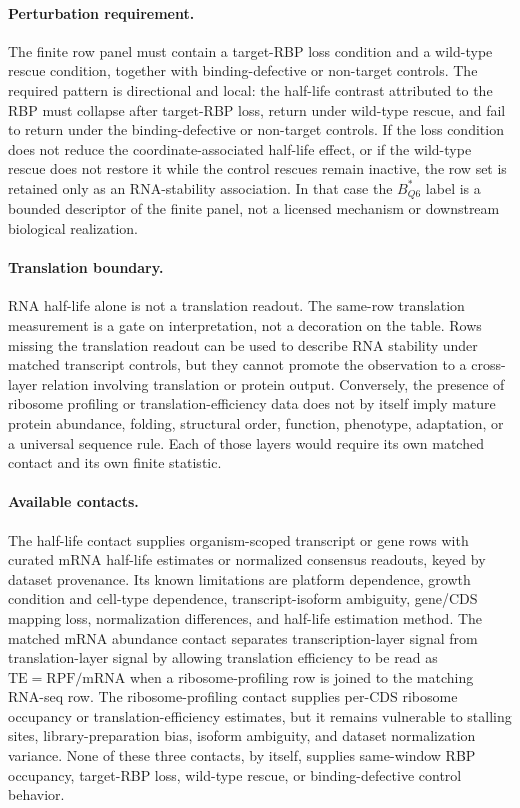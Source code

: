\paragraph{Perturbation requirement.}
The finite row panel must contain a target-RBP loss condition and a wild-type rescue condition, together with binding-defective or non-target controls.  The required pattern is directional and local: the half-life contrast attributed to the RBP must collapse after target-RBP loss, return under wild-type rescue, and fail to return under the binding-defective or non-target controls.  If the loss condition does not reduce the coordinate-associated half-life effect, or if the wild-type rescue does not restore it while the control rescues remain inactive, the row set is retained only as an RNA-stability association.  In that case the $B^{*}_{Q6}$ label is a bounded descriptor of the finite panel, not a licensed mechanism or downstream biological realization.

\paragraph{Translation boundary.}
RNA half-life alone is not a translation readout.  The same-row translation measurement is a gate on interpretation, not a decoration on the table.  Rows missing the translation readout can be used to describe RNA stability under matched transcript controls, but they cannot promote the observation to a cross-layer relation involving translation or protein output.  Conversely, the presence of ribosome profiling or translation-efficiency data does not by itself imply mature protein abundance, folding, structural order, function, phenotype, adaptation, or a universal sequence rule.  Each of those layers would require its own matched contact and its own finite statistic.

\paragraph{Available contacts.}
The half-life contact supplies organism-scoped transcript or gene rows with curated mRNA half-life estimates or normalized consensus readouts, keyed by dataset provenance.  Its known limitations are platform dependence, growth condition and cell-type dependence, transcript-isoform ambiguity, gene/CDS mapping loss, normalization differences, and half-life estimation method.  The matched mRNA abundance contact separates transcription-layer signal from translation-layer signal by allowing translation efficiency to be read as $\mathrm{TE}=\mathrm{RPF}/\mathrm{mRNA}$ when a ribosome-profiling row is joined to the matching RNA-seq row.  The ribosome-profiling contact supplies per-CDS ribosome occupancy or translation-efficiency estimates, but it remains vulnerable to stalling sites, library-preparation bias, isoform ambiguity, and dataset normalization variance.  None of these three contacts, by itself, supplies same-window RBP occupancy, target-RBP loss, wild-type rescue, or binding-defective control behavior.

